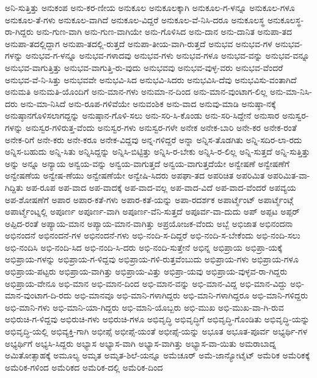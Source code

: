 {ಅನಿ-ಸುತ್ತಿತ್ತು
ಅನುಕಂಪ
ಅನು-ಕರ-ಣೀಯ
ಅನುಕೂಲ
ಅನುಕೂಲಕ್ಕಾಗಿ
ಅನುಕೂಲ-ಗ-ಳನ್ನೂ
ಅನುಕೂಲ-ಗಳೂ
ಅನುಕೂಲ-ತೆ-ಗಳು
ಅನುಕೂಲ-ವಾಗಿದೆ
ಅನುಕೂಲ-ವಿದ್ದರೆ
ಅನುಕೂಲ-ವೆ-ನಿಸಿ-ದರೂ
ಅನುಕೂಲಸ್ಥ
ಅನುಕೂಲಸ್ಥ-ರಾ-ಗಿದ್ದರು
ಅನು-ಗುಣ-ವಾಗಿ
ಅನು-ಗುಣ-ವಾಗಿಯೇ
ಅನು-ಗೊಳಿಸಿದ
ಅನು-ದಾನ
ಅನು-ದಾನಿತ
ಅನುಪಾ-ತದ
ಅನುಪಾ-ತದಲ್ಲಿದ್ದಾಗ
ಅನುಪಾ-ತದಲ್ಲಿ-ರುತ್ತದೆ
ಅನುಪಾ-ತೀಯ-ವಾಗಿ-ರುತ್ತದೆ
ಅನುಭವ
ಅನುಭವ-ಗಳ
ಅನುಭವ-ಗಳನ್ನು
ಅನುಭವ-ಗ-ಳನ್ನೂ
ಅನುಭವ-ಗಳಾದವು
ಅನುಭವ-ಗಳು
ಅನುಭವ-ಗಳೂ
ಅನುಭವ-ವನ್ನು
ಅನುಭವ-ವನ್ನೂ
ಅನುಭವ-ವಾಗುತ್ತಿತ್ತು
ಅನುಭವ-ವಾಗುತ್ತಿ-ರು-ವುದು
ಅನುಭವವು
ಅನುಭವ-ವುಳ್ಳ-ವರು
ಅನುಭವ-ವೆಂದರೆ
ಅನುಭವ-ವೆ-ನಿ-ಸಿತ್ತು
ಅನುಭವವೇ
ಅನುಭವಿ-ಸಿದ
ಅನುಭವಿ-ಸಿದರು
ಅನುಭವಿಸಿ-ದೆವು
ಅನುಭವಿಸು-ವಂತಾಗಿದೆ
ಅನುಮತಿ
ಅನುಮತಿ-ಯೊಂದಿಗೆ
ಅನು-ಮಾನ-ಗಳು
ಅನುಮಾ-ನ-ದಿಂದ
ಅನು-ಮಾನ-ವುಂಟಾಗ-ಲಿಲ್ಲ
ಅನು-ಮಾ-ನಿಸಿ-ದರು
ಅನು-ಮಾ-ನಿಸಿದೆ
ಅನು-ರೂಪ-ಗಳಿವೆಯೇ
ಅನುವಂಶಿಕ
ಅನು-ವಾದ
ಅನುವು-ಮಾಡಿ
ಅನುಷ್ಠಾ-ನಕ್ಕೆ
ಅನುಷ್ಠಾನಗೊಳಿಸಲಾಗದ್ದನ್ನು
ಅನುಷ್ಠಾನ-ಗೊಳಿ-ಸಲು
ಅನು-ಸರಿ-ಸಿ-ಕೊಂಡು
ಅನು-ಸರಿ-ಸಿದ್ದೇನೆ
ಅನುಸಾರ
ಅನುಸ್ವರ-ಗಳನ್ನು
ಅನುಸ್ವರ-ಗಳಿರುತ್ತ-ವೆಂದು
ಅನುಸ್ವರ-ಗಳು
ಅನುಸ್ವರ-ಗಳೇ
ಅನೇಕ
ಅನೇಕ-ಬಾರಿ
ಅನೇ-ಕರ
ಅನೇಕ-ರಂತೆ
ಅನೇಕ-ರಿಗೆ
ಅನೇ-ಕರು
ಅನೇ-ಕರೂ
ಅನೇಕ-ವಿದ್ದವು
ಅನ್ನ-ಗಳಿದ್ದರೆ
ಅನ್ನಾ
ಅನ್ನಿಸ-ತೊಡಗಿತು
ಅನ್ನಿ-ಸದಿರ-ಲಾ-ರದು
ಅನ್ನಿಸ-ಬಹುದು
ಅನ್ನಿ-ಸಿತು
ಅನ್ನಿಸಿದ್ದನ್ನು
ಅನ್ನಿಸಿ-ಬಿಟ್ಟಿತ್ತು
ಅನ್ನಿಸಿ-ರ-ಬೇಕು
ಅನ್ನಿಸಿ-ರ-ಲಿಲ್ಲ
ಅನ್ನಿ-ಸುತ್ತದೆ
ಅನ್ನಿ-ಸುತ್ತಿತ್ತು
ಅನ್ನು
ಅನ್ನೂ
ಅನ್ಯಾಯ
ಅನ್ವಯ-ವನ್ನು
ಅನ್ವಯ-ವಾಗುತ್ತದೆ
ಅನ್ವಯ-ವಾಗುತ್ತದೆಯೇ
ಅನ್ವೇಷಣೆ
ಅನ್ವೇಷಣೆಗೆ
ಅನ್ವೇಷಣೆಯ
ಅನ್ವೇಷ-ಣೆಯು
ಅನ್ವೇಷಣೆಯೇ
ಅನ್ವೇಷಿ-ಸಿದರು
ಅಪಘಾ-ತದ
ಅಪರಿಚಿತ
ಅಪರಿಮಿತ
ಅಪರಿಮಿತ-ವಾ-ಗಿದ್ದಿತು
ಅಪ-ರೂಪ
ಅಪ-ವಾದ
ಅಪ-ವಾದಕ್ಕೆ
ಅಪ-ವಾದ-ವಲ್ಲ
ಅಪ-ವಾದ-ವಿದೆ
ಅಪ-ವಾದ-ವೆಂದರೆ
ಅಪವ್ಯಯ
ಅಪ-ಶೋಷಣೆಗೆ
ಅಪಾರ
ಅಪಾರ-ಕತೆ-ಗಳು
ಅಪಾರ-ಕತೆ-ಯನ್ನು
ಅಪಾ-ರದರ್ಶಕ
ಅಪಾರ್ಟ್ಮೆಂಟ್
ಅಪಾರ್ಟ್ಮೆಂಟ್ಗೆ
ಅಪಾರ್ಟ್ಮೆಂಟ್ನಲ್ಲಿ
ಅಪೂರ್ಣ
ಅಪೂರ್ಣ-ವಾಗಿ
ಅಪೂರ್ಣ-ವೆನಿ-ಸುತ್ತದೆ
ಅಪೂರ್ವ-ವಾ-ದುದು
ಅಪ್
ಅಪ್ಪಟ
ಅಪ್ಪರ್
ಅಪ್ಪಿದ-ರಂತೆ
ಅಪ್ಯಾಯ-ಮಾನ
ಅಪ್ಯಾಯ-ಮಾನ-ವಾಗಿತ್ತು
ಅಪ್ರಯೋಜಕ-ವೆಂದು
ಅಬ್ಬೆ
ಅಭಿಜಾತ
ಅಭಿನಂದನಾ
ಅಭಿನಂದನೆ
ಅಭಿನಂದನೆ-ಗಳ
ಅಭಿನಂದನೆ-ಗಳು
ಅಭಿ-ನಂದಿ-ಸ-ದಿದ್ದರೆ
ಅಭಿ-ನಂದಿ-ಸ-ಬೇಕೆಂದು
ಅಭಿ-ನಂದಿ-ಸಲು
ಅಭಿ-ನಂದಿಸಿ
ಅಭಿ-ನಂದಿ-ಸಿದ
ಅಭಿ-ನಂದಿ-ಸಿ-ದರು
ಅಭಿ-ನಂದಿ-ಸುತ್ತೇನೆ
ಅಭಿನ್ನ
ಅಭಿಪ್ರಾಯ
ಅಭಿಪ್ರಾ-ಯಕ್ಕೆ
ಅಭಿಪ್ರಾಯ-ಗಳನ್ನು
ಅಭಿಪ್ರಾಯ-ಗ-ಳಿದ್ದವು
ಅಭಿಪ್ರಾಯ-ಗಳಿ-ರುತ್ತವೆಂಬುದು
ಅಭಿಪ್ರಾಯ-ಗಳು
ಅಭಿಪ್ರಾಯ-ಗಳೂ
ಅಭಿಪ್ರಾಯ-ಪಟ್ಟರು
ಅಭಿಪ್ರಾಯ-ವಾಗಿತ್ತು
ಅಭಿಪ್ರಾಯ-ವಿತ್ತು
ಅಭಿಪ್ರಾ-ಯವು
ಅಭಿಪ್ರಾಯ-ವುಳ್ಳವ-ರಾ-ಗಿದ್ದರು
ಅಭಿಪ್ರಾಯ-ವೇನೂ
ಅಭಿ-ಮಾನ
ಅಭಿ-ಮಾನ-ದಿಂದ
ಅಭಿ-ಮಾನ-ವನ್ನು
ಅಭಿ-ಮಾನ-ವಿದ್ದ
ಅಭಿ-ಮಾನ-ವಿದ್ದು
ಅಭಿ-ಮಾನ-ವುಂಟಾಗ-ದಿ-ರದು
ಅಭಿ-ಮಾನವೂ
ಅಭಿ-ಮಾನಿ-ಗಳಾಗಿದ್ದರು
ಅಭಿ-ಮಾನಿ-ಗಳಾಗಿದ್ದರೂ
ಅಭಿ-ಮಾನಿ-ಗಳಿದ್ದರು
ಅಭಿ-ಮಾನಿ-ಗಳು
ಅಭಿ-ಮಾನಿ-ಯಾ-ಗಿದ್ದರು
ಅಭಿ-ಮಾನಿ-ಯೊಬ್ಬರು
ಅಭಿ-ಮುಖ
ಅಭಿ-ಮುಖ-ವಾ-ಗಿ-ರುವ
ಅಭಿರುಚಿ-ಗ-ಳಿದ್ದವು
ಅಭಿರುಚಿ-ಗಳು
ಅಭಿರುಚಿ-ಗಳೂ
ಅಭಿವೃದ್ಧಿ
ಅಭಿವೃದ್ಧಿಗೆ
ಅಭಿವೃದ್ಧಿ-ಗೊಂಡಿತು
ಅಭಿವೃದ್ಧಿ-ಯನ್ನು
ಅಭಿವೃದ್ಧಿ-ಯಲ್ಲಿ
ಅಭಿವ್ಯಕ್ತಿ-ಗಾಗಿ
ಅಭೀಪ್ಸೆ
ಅಭೀಪ್ಸೆ-ಯಂತೆ
ಅಭೀಪ್ಸೆ-ಯನ್ನು
ಅಭೂತ
ಅಭೂತ-ಪೂರ್ವ
ಅಭ್ಯರ್ಥಿ-ಗಳ
ಅಭ್ಯರ್ಥಿಗೆ
ಅಭ್ಯಸಿ-ಸಿದ್ದರು
ಅಭ್ಯಾಸ
ಅಭ್ಯಾಸ-ವಾಗಿ
ಅಭ್ಯಾಸ-ವಾಗಿತ್ತು
ಅಭ್ಯಾಸ-ವಾ-ಯಿತು
ಅಮರಾಬಾದ್ನ
ಅಮಿತೋತ್ಸಾಹಕ್ಕೆ
ಅಮೂಲ್ಯ
ಅಮೃತ
ಅಮೃತ-ಶಿಲೆ-ಯನ್ನೂ
ಅಮೆಚೂರ್
ಅಮೆ-ಜಾನ್ಯೋಟೈಟ್
ಅಮೆರಿಕ
ಅಮೆರಿಕಕ್ಕೆ
ಅಮೆರಿಕ-ಗಳಿಂದ
ಅಮೆರಿಕದ
ಅಮೆರಿಕ-ದಲ್ಲಿ
ಅಮೆರಿಕ-ದಿಂದ
}
